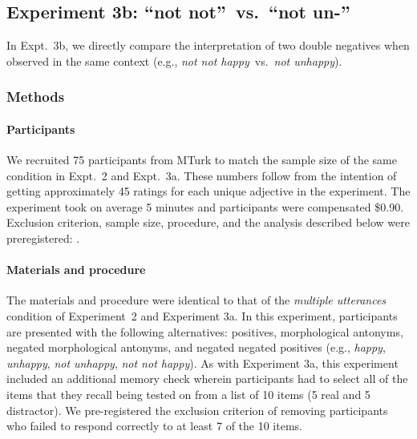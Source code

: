 \documentclass[floatsintext,doc]{apa6}
\let\oldparagraph\paragraph
\renewcommand{\paragraph}[1]{\oldparagraph{#1}\mbox{}}
\begin{document}


\subsection{Experiment 3b: ``not not''~vs.~``not un-''}

In Expt.~3b, we directly compare the interpretation of two double negatives when observed in the same context (e.g., \emph{not not happy}~vs.~\emph{not unhappy}).

\subsubsection{Methods}

\paragraph{Participants}\label{participants-3}

We recruited 75 participants from MTurk to match the sample size of the same condition in Expt.~2 and Expt.~3a.
These numbers follow from the intention of getting approximately 45 ratings for each unique adjective in the experiment.
The experiment took on average 5 minutes and participants were compensated \$0.90.
Exclusion criterion, sample size, procedure, and the analysis described below were preregistered: .

\paragraph{Materials and procedure}\label{materials-3}

The materials and procedure were identical to that of the \emph{multiple utterances} condition of Experiment~2 and Experiment 3a.
In this experiment, participants are presented with the following alternatives: positives, morphological antonyms, negated morphological antonyms, and negated negated positives (e.g., \emph{happy}, \emph{unhappy}, \emph{not unhappy}, \emph{not not happy}).
As with Experiment 3a, this experiment included an additional memory check wherein participants had to select all of the items that they recall being tested on from a list of 10 items (5 real and 5 distractor). 
We pre-registered the exclusion criterion of removing participants who failed to respond correctly to at least 7 of the 10 items. 
\end{document}
